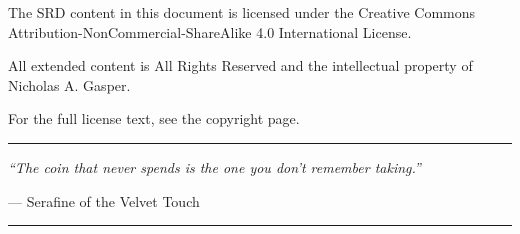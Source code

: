 \documentclass[10pt]{article}
\begin{document}
The SRD content in this document is licensed under the Creative Commons Attribution-NonCommercial-ShareAlike 4.0 International License.

All extended content is All Rights Reserved and the intellectual property of Nicholas A. Gasper.

For the full license text, see the copyright page.

\vspace{0.5cm}

\begin{center}
\rule{0.4\textwidth}{0.5pt}

\textit{``The coin that never spends is the one you don't remember taking.''}

--- Serafine of the Velvet Touch

\rule{0.4\textwidth}{0.5pt}
\end{center}


\end{document}

